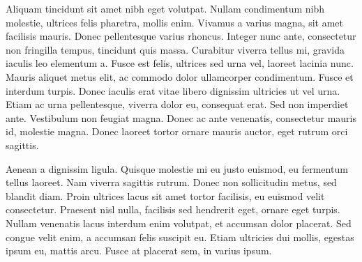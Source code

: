 Aliquam tincidunt sit amet nibh eget volutpat. Nullam condimentum nibh molestie, ultrices felis pharetra, mollis enim. Vivamus a varius magna, sit amet facilisis mauris. Donec pellentesque varius rhoncus. Integer nunc ante, consectetur non fringilla tempus, tincidunt quis massa. Curabitur viverra tellus mi, gravida iaculis leo elementum a. Fusce est felis, ultrices sed urna vel, laoreet lacinia nunc. Mauris aliquet metus elit, ac commodo dolor ullamcorper condimentum. Fusce et interdum turpis. Donec iaculis erat vitae libero dignissim ultricies ut vel urna. Etiam ac urna pellentesque, viverra dolor eu, consequat erat. Sed non imperdiet ante. Vestibulum non feugiat magna. Donec ac ante venenatis, consectetur mauris id, molestie magna. Donec laoreet tortor ornare mauris auctor, eget rutrum orci sagittis.

Aenean a dignissim ligula. Quisque molestie mi eu justo euismod, eu fermentum tellus laoreet. Nam viverra sagittis rutrum. Donec non sollicitudin metus, sed blandit diam. Proin ultrices lacus sit amet tortor facilisis, eu euismod velit consectetur. Praesent nisl nulla, facilisis sed hendrerit eget, ornare eget turpis. Nullam venenatis lacus interdum enim volutpat, et accumsan dolor placerat. Sed congue velit enim, a accumsan felis suscipit eu. Etiam ultricies dui mollis, egestas ipsum eu, mattis arcu. Fusce at placerat sem, in varius ipsum.